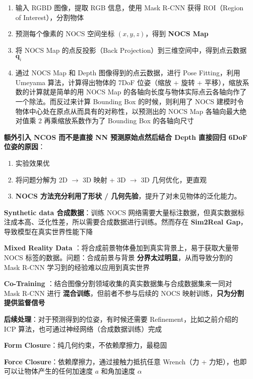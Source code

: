 \documentclass[
  8pt]{extarticle}
\providecommand{\tightlist}{%
  \setlength{\itemsep}{0pt}\setlength{\parskip}{0pt}}
\begin{document}
\begin{multicols*}{4}
\begin{enumerate}
\def\labelenumi{\arabic{enumi}.}
\tightlist
\item
  输入 RGBD 图像，提取 RGB 信息，使用 Mask R-CNN 获得 ROI（Region of
  Interest），分割物体
\item
  预测每个像素的 NOCS 空间坐标 \((x,y,z)\)，得到 \textbf{NOCS Map}
\item
  将 NOCS Map 的点反投影（Back Projection）到三维空间中，得到点云数据
  \(\mathbf{q}_i\)
\item
  通过 NOCS Map 和 Depth 图像得到的点云数据，进行 Pose Fitting，利用
  Umeyama 算法，计算得出物体的 7DoF 位姿（缩放 + 旋转 +
  平移），缩放系数的计算就是简单的用 NOCS Map
  的各轴向长度与物体实际点云各轴向作了一个除法。而反过来计算 Bounding
  Box 的时候，则利用了 NOCS
  建模时令物体中心处在原点从而具有的对称性，以预测出的 NOCS Map
  各轴向最大绝对值乘 2 再乘缩放系数作为了 Bounding Box 的各轴向尺寸
\end{enumerate}

\textbf{额外引入 NCOS 而不是直接 NN 预测原始点然后结合 Depth 直接回归
6DoF 位姿的原因}：

\begin{enumerate}
\def\labelenumi{\arabic{enumi}.}
\tightlist
\item
  实验效果优
\item
  将问题分解为 2D \(\to\) 3D 映射 + 3D \(\to\) 3D 几何优化，更直观
\item
  \textbf{NOCS 方法充分利用了形状 /
  几何先验}，提升了对未见物体的泛化能力。
\end{enumerate}

\textbf{Synthetic data 合成数据}：训练 NOCS
网络需要大量标注数据，但真实数据标注成本高、泛化性差，所以需要合成数据进行训练。然而存在
\textbf{Sim2Real Gap}，导致模型在真实世界性能下降

\textbf{Mixed Reality Data}
：将合成前景物体叠加到真实背景上，易于获取大量带 NOCS
标签的数据。问题：合成前景与背景 \textbf{分界太过明显}，从而导致分割的
Mask R-CNN 学习到的经验难以应用到真实世界

\textbf{Co-Training}
：结合图像分割领域收集的真实数据集与合成数据集来一同对 Mask R-CNN 进行
\textbf{混合训练}，但前者不参与后续的 NOCS
映射训练，\textbf{只为分割提供监督信号}

\textbf{后续处理}：对于预测得到的位姿，有时候还需要
Refinement，比如之前介绍的 ICP
算法，也可通过神经网络（合成数据训练）完成

\textbf{Form Closure}：纯几何约束，不依赖摩擦力，最稳固

\textbf{Force Closure}：依赖摩擦力，通过接触力抵抗任意 Wrench（力 +
力矩），也即可以让物体产生的任何加速度 \(a\) 和角加速度 \(\alpha\)


\end{multicols*}
\end{document}
